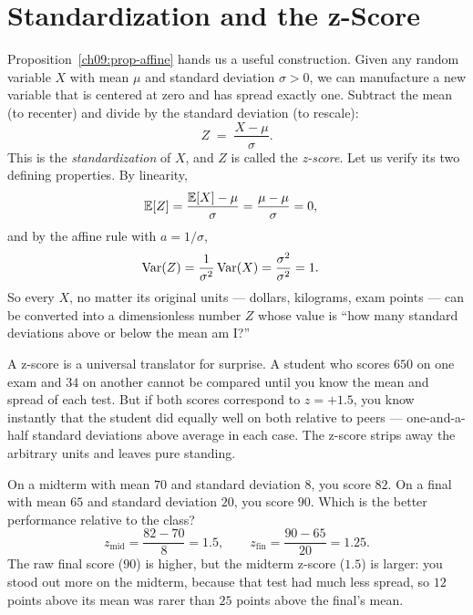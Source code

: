 \section{Standardization and the z-Score}
\label{ch09:zscore}

Proposition~\ref{ch09:prop-affine} hands us a useful construction. Given any
random variable $X$ with mean $\mu$ and standard deviation $\sigma > 0$, we
can manufacture a new variable that is centered at zero and has spread
exactly one. Subtract the mean (to recenter) and divide by the standard
deviation (to rescale):
\[
  Z \;=\; \frac{X - \mu}{\sigma}.
\]
This is the \emph{standardization} of $X$, and $Z$ is called the
\emph{z-score}. Let us verify its two defining properties. By linearity,
\begin{align*}
  \operatorname{\mathbb{E}}[Z] &= \frac{\operatorname{\mathbb{E}}[X] - \mu}{\sigma} = \frac{\mu - \mu}{\sigma} = 0,
\end{align*}
and by the affine rule with $a = 1/\sigma$,
\begin{align*}
  \operatorname{Var}(Z) &= \frac{1}{\sigma^2}\operatorname{Var}(X) = \frac{\sigma^2}{\sigma^2} = 1.
\end{align*}
So every $X$, no matter its original units --- dollars, kilograms, exam
points --- can be converted into a dimensionless number $Z$ whose value is
``how many standard deviations above or below the mean am I?''

\begin{intuitionbox}
A z-score is a universal translator for surprise. A student who scores $650$
on one exam and $34$ on another cannot be compared until you know the mean and
spread of each test. But if both scores correspond to $z = +1.5$, you know
instantly that the student did equally well on both relative to peers ---
one-and-a-half standard deviations above average in each case. The z-score
strips away the arbitrary units and leaves pure standing.
\end{intuitionbox}

\begin{example}
\label{ch09:ex-exams}
On a midterm with mean $70$ and standard deviation $8$, you score $82$. On a
final with mean $65$ and standard deviation $20$, you score $90$. Which is the
better performance relative to the class?
\[
  z_{\text{mid}} = \frac{82-70}{8} = 1.5,
  \qquad
  z_{\text{fin}} = \frac{90-65}{20} = 1.25.
\]
The raw final score ($90$) is higher, but the midterm z-score ($1.5$) is
larger: you stood out more on the midterm, because that test had much less
spread, so $12$ points above its mean was rarer than $25$ points above the
final's mean.
\end{example}

